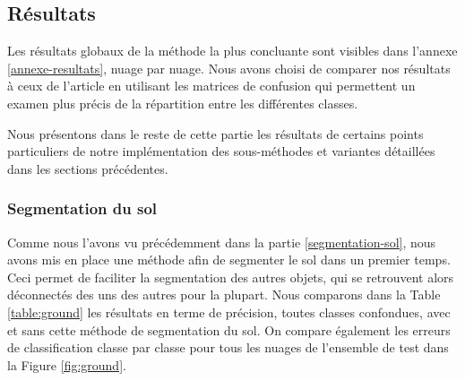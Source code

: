 \documentclass[a4paper, onecolumn, 11pt]{article}
\begin{document}
\subsection{Résultats}

Les résultats globaux de la méthode la plus concluante sont visibles dans l'annexe \ref{annexe-resultats}, nuage par nuage. Nous avons choisi de comparer nos résultats à ceux de l'article \cite{aka_article} en utilisant les matrices de confusion qui permettent un examen plus précis de la répartition entre les différentes classes.

Nous présentons dans le reste de cette partie les résultats de certains points particuliers de notre implémentation des sous-méthodes et variantes détaillées dans les sections précédentes.

\subsubsection{Segmentation du sol}

Comme nous l'avons vu précédemment dans la partie \ref{segmentation-sol}, nous avons mis en place une méthode afin de segmenter le sol dans un premier temps. Ceci permet de faciliter la segmentation des autres objets, qui se retrouvent alors déconnectés des uns des autres pour la plupart. Nous comparons dans la Table \ref{table:ground} les résultats en terme de précision, toutes classes confondues, avec et sans cette méthode de segmentation du sol. On compare également les erreurs de classification classe par classe pour tous les nuages de l'ensemble de test dans la Figure \ref{fig:ground}.
\end{document}
